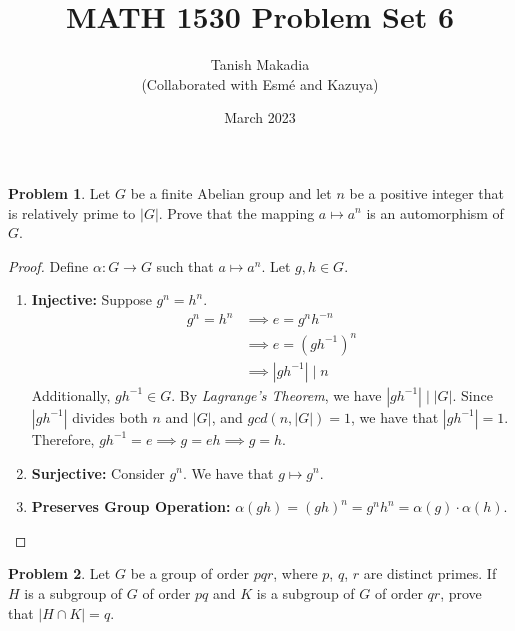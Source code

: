 \documentclass[12pt,reqno]{article}
\title{MATH 1530 Problem Set 6}
\author{Tanish Makadia\\\small{(Collaborated with Esmé and Kazuya)}}
\date{March 2023}
\theoremstyle{plain}
\theoremstyle{definition}
\newtheorem{problem}{Problem}
\begin{document}
\maketitle


\begin{problem} 
    Let $G$ be a finite Abelian group and let $n$ be a positive integer that is relatively prime to $|G|$.
    Prove that the mapping 
    $a \mapsto a^n$
    is an automorphism of $G$.
\end{problem}

\begin{proof}
    Define \(\alpha : G\to G\) such that \(a\mapsto a^n\). Let \(g,h\in G\).
    \begin{enumerate}
        \item \textbf{Injective:} Suppose \(g^n=h^n\).
        \begin{align*}
            g^n=h^n &\implies e=g^nh^{-n}\\
            &\implies e=(gh^{-1})^n\\
            &\implies |gh^{-1}|\mid n
        \end{align*}
        Additionally, \(gh^{-1}\in G\). By \emph{Lagrange's Theorem}, we have \(|gh^{-1}|\mid |G|\).
        Since \(|gh^{-1}|\) divides both \(n\) and \(|G|\), and \(gcd(n, |G|)=1\), we have that \(|gh^{-1}|=1\).
        Therefore, \(gh^{-1}=e\implies g=eh\implies g=h\).

        \item \textbf{Surjective:} Consider \(g^n\). We have that \(g\mapsto g^n\).
        \item \textbf{Preserves Group Operation:} \(\alpha(gh)=(gh)^n=g^nh^n=\alpha(g)\cdot \alpha(h)\).
    \end{enumerate}
\end{proof}

\newpage
    

\begin{problem} 
    Let $G$ be a group of order $pqr$, where $p$, $q$, $r$ are distinct primes. If $H$ is a subgroup of $G$ of order $pq$ and $K$ is a subgroup of $G$ of order $qr$, prove that $|H \cap K| = q$.
\end{problem}
\end{document}
